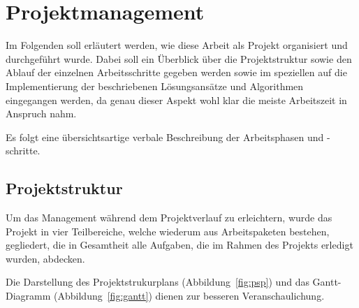 \chapter{Projektmanagement}

Im Folgenden soll erläutert werden, wie diese Arbeit als Projekt organisiert und durchgeführt wurde. Dabei soll ein Überblick über die Projektstruktur sowie den Ablauf der einzelnen Arbeitsschritte gegeben werden sowie im speziellen auf die Implementierung der beschriebenen Lösungsansätze und Algorithmen eingegangen werden, da genau dieser Aspekt wohl klar die meiste Arbeitszeit in Anspruch nahm.

Es folgt eine übersichtsartige verbale Beschreibung der Arbeitsphasen und -schritte.

\section{Projektstruktur}

Um das Management während dem Projektverlauf zu erleichtern, wurde das Projekt in vier Teilbereiche, welche wiederum aus Arbeitspaketen bestehen, gegliedert, die in Gesamtheit alle Aufgaben, die im Rahmen des Projekts erledigt wurden, abdecken.

Die Darstellung des Projektstrukurplans (Abbildung~\ref{fig:psp}) und das Gantt-Diagramm (Abbildung~\ref{fig:gantt}) dienen zur besseren Veranschaulichung.

